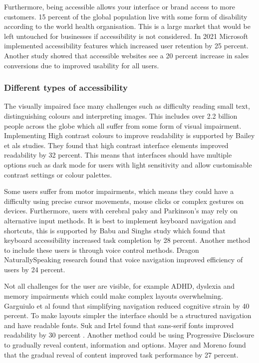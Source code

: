 \documentclass[]{project_final}
\begin{document}
Furthermore, being accessible allows your interface or brand access to more customers. 15 percent of the global population live with some form of disability according to the world health organisation. This is a large market that would be left untouched for businesses if accessibility is not considered. In 2021 Microsoft implemented accessibility features which increased user retention by 25 percent. Another study showed that accessible websites see a 20 percent increase in sales conversions due to improved usability for all users.

\subsubsection{Different types of accessibility}

The visually impaired face many challenges such as difficulty reading small text, distinguishing colours and interpreting images. This includes over 2.2 billion people across the globe which all suffer from some form of visual impairment.
Implementing High contrast colours to improve readability is supported by Bailey et als studies. They found that high contrast interface elements improved readability by 32 percent. This means that interfaces should have multiple options such as dark mode for users with light sensitivity and allow customisable contrast settings or colour palettes.

Some users suffer from motor impairments, which means they could have a difficulty using precise cursor movements, mouse clicks or complex gestures on devices. Furthermore, users with cerebral palsy and Parkinson's may rely on alternative input methods.
It is best to implement keyboard navigation and shortcuts, this is supported by Babu and Singhs study which found that keyboard accessibility increased task completion by 28 percent.
Another method to include these users is through voice control methods. Dragon NaturallySpeaking research found that voice navigation improved efficiency of users by 24 percent.

Not all challenges for the user are visible, for example ADHD, dyslexia and memory impairments which could make complex layouts overwhelming. Garguiulo et al found that simplifying navigation reduced cognitive strain by 40 percent. To make layouts simpler the interface should be a structured navigation and have readable fonts. Suk and Irtel found that sans-serif fonts improved readability by 30 percent . Another method could be using Progressive Disclosure to gradually reveal content, information and options. Mayer and Moreno found that the gradual reveal of content improved task performance by 27 percent.
\end{document}
